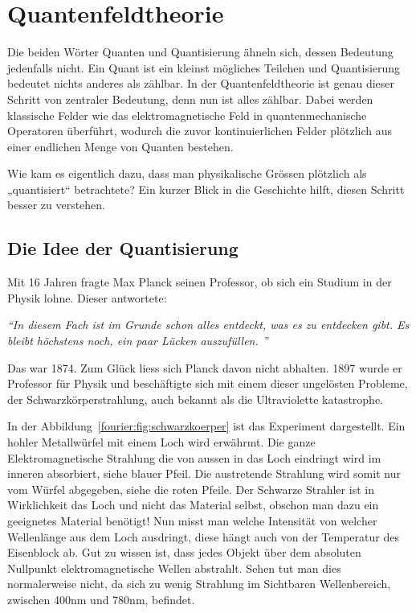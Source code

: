 %
%
%
%
\section{Quantenfeldtheorie\label{fourier:section:quantenfeldtheorie}}
Die beiden Wörter Quanten und Quantisierung ähneln sich, dessen Bedeutung jedenfalls nicht. 
Ein Quant ist ein kleinst mögliches Teilchen und Quantisierung bedeutet nichts anderes als zählbar. 
In der Quantenfeldtheorie ist genau dieser Schritt von zentraler Bedeutung, denn nun ist alles zählbar. 
Dabei werden klassische Felder wie das elektromagnetische Feld in quantenmechanische Operatoren überführt, wodurch die zuvor kontinuierlichen Felder plötzlich aus einer endlichen Menge von Quanten bestehen.

Wie kam es eigentlich dazu, dass man physikalische Grössen plötzlich als „quantisiert“ betrachtete?
Ein kurzer Blick in die Geschichte hilft, diesen Schritt besser zu verstehen.

\subsection{Die Idee der Quantisierung\label{fourier:subsection:DieIdeeDerQuantisierung}}
	Mit 16 Jahren fragte Max Planck seinen Professor, ob sich ein Studium in der Physik lohne. 
	Dieser antwortete:
	
	\begin{center}
		\textit{``{}In diesem Fach ist im Grunde schon alles entdeckt, was es zu entdecken gibt.
		Es bleibt höchstens noch, ein paar Lücken auszufüllen. ''}
	\end{center}
	
	Das war 1874.
	Zum Glück liess sich Planck davon nicht abhalten.
	1897 wurde er Professor für Physik und beschäftigte sich mit einem dieser ungelösten Probleme, der Schwarzkörperstrahlung, auch bekannt als die Ultraviolette katastrophe. 
	
	
	In der Abbildung~\ref{fourier:fig:schwarzkoerper} ist das Experiment dargestellt. Ein hohler Metallwürfel mit einem Loch wird erwährmt. Die ganze Elektromagnetische Strahlung die von aussen in das Loch eindringt wird im inneren absorbiert, siehe blauer Pfeil. Die austretende Strahlung wird somit nur vom Würfel abgegeben, siehe die roten Pfeile. Der Schwarze Strahler ist in Wirklichkeit das Loch und nicht das Material selbst, obschon man dazu ein geeignetes Material benötigt! Nun misst man welche Intensität von welcher Wellenlänge aus dem Loch ausdringt, diese hängt auch von der Temperatur des Eisenblock ab. 
	Gut zu wissen ist, dass jedes Objekt über dem absoluten Nullpunkt elektromagnetische Wellen abstrahlt. 
	Sehen tut man dies normalerweise nicht, da sich zu wenig Strahlung im Sichtbaren Wellenbereich, zwischen 400nm und 780nm, befindet. 
	
